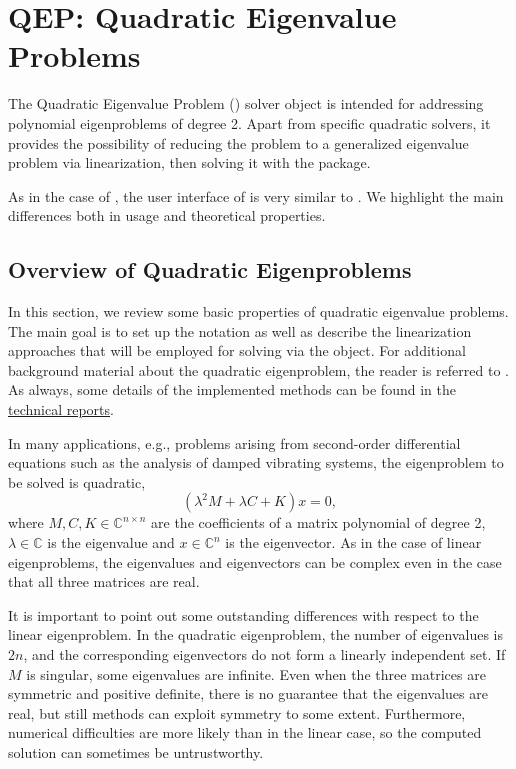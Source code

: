 \chapter{\label{cap:qep}QEP: Quadratic Eigenvalue Problems}

\noindent The Quadratic Eigenvalue Problem () solver object is intended for addressing polynomial eigenproblems of degree 2. Apart from specific quadratic solvers, it provides the possibility of reducing the problem to a generalized eigenvalue problem via linearization, then solving it with the  package.

As in the case of , the user interface of  is very similar to . We highlight the main differences both in usage and theoretical properties.

\section{\label{sec:qep}Overview of Quadratic Eigenproblems}

In this section, we review some basic properties of quadratic eigenvalue problems. The main goal is to set up the notation as well as describe the linearization approaches that will be employed for solving via the  object. For additional background material about the quadratic eigenproblem, the reader is referred to \citep{Tisseur:2001:QEP}. As always, some details of the implemented methods can be found in the \slepc \hyperlink{str}{technical reports}.

In many applications, e.g., problems arising from second-order differential equations such as the analysis of damped vibrating systems, the eigenproblem to be solved is quadratic,
\begin{equation}
(\lambda^2M+\lambda C+K)x=0,\label{eq:eigquad}
\end{equation}
where $M,C,K\in\mathbb{C}^{n\times n}$ are the coefficients of a matrix polynomial of degree 2, $\lambda\in\mathbb{C}$ is the eigenvalue and $x\in\mathbb{C}^n$ is the eigenvector. As in the case of linear eigenproblems, the eigenvalues and eigenvectors can be complex even in the case that all three matrices are real.

It is important to point out some outstanding differences with respect to the linear eigenproblem. In the quadratic eigenproblem, the number of eigenvalues is $2n$, and the corresponding eigenvectors do not form a linearly independent set. If $M$ is singular, some eigenvalues are infinite. Even when the three matrices are symmetric and positive definite, there is no guarantee that the eigenvalues are real, but still methods can exploit symmetry to some extent. Furthermore, numerical difficulties are more likely than in the linear case, so the computed solution can sometimes be untrustworthy.

